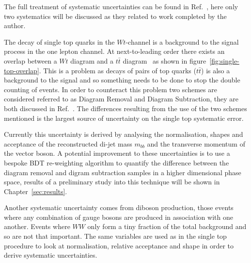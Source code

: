 The full treatment of systematic uncertainties can be found in Ref.~\cite{ATLAS-CONF-2018-036},
here only two systematics will be discussed as they related to work completed by the author.

The decay of single top quarks in the $Wt$-channel is a background to the signal process in the one
lepton channel. At next-to-leading order there exists an overlap between a $Wt$ diagram and a
$t\bar{t}$ diagram~\cite{White:single-top} as shown in figure~\ref{fig:single-top-overlap}. This is a
problem as decays of pairs of top quarks ($t\bar{t}$) is also a background to the signal and so
something needs to be done to stop the double counting of events. In order to counteract this problem
two schemes are considered referred to as Diagram Removal and Diagram Subtraction, they are both
discussed in Ref.~\cite{White:single-top}. The differences resulting from the use of the two
schemes mentioned is the largest source of uncertainty on the single top systematic error.

Currently this uncertainty is derived by analysing the normalisation, shapes and acceptance of the
reconstructed di-jet mass $m_{bb}$ and the transverse momentum of the vector boson. A potential
improvement to these uncertainties is to use a bespoke BDT re-weighting algorithm to quantify the
difference between the diagram removal and digram subtraction samples in a higher dimensional phase
space, results of a preliminary study into this technique will be shown in Chapter~\ref{sec:results}.

Another systematic uncertainty comes from diboson production, those events where any combination
of gauge bosons are produced in association with one another. Events where $WW$ only form a tiny
fraction of the total background and so are not that important. The same variables are used as in
the single top procedure to look at normalisation, relative acceptance and shape in order to derive
systematic uncertainties. 
